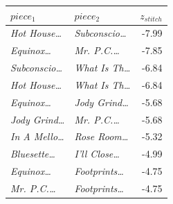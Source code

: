 \begin{tabular}{llr}
\toprule
$piece_1$ & $piece_2$ & $z_{stitch}$ \\
\midrule
\textit{Hot House\dots} & \textit{Subconscio\dots} & -7.99 \\
\textit{Equinox\dots} & \textit{Mr. P.C.\dots} & -7.85 \\
\textit{Subconscio\dots} & \textit{What Is Th\dots} & -6.84 \\
\textit{Hot House\dots} & \textit{What Is Th\dots} & -6.84 \\
\textit{Equinox\dots} & \textit{Jody Grind\dots} & -5.68 \\
\textit{Jody Grind\dots} & \textit{Mr. P.C.\dots} & -5.68 \\
\textit{In A Mello\dots} & \textit{Rose Room\dots} & -5.32 \\
\textit{Bluesette\dots} & \textit{I'll Close\dots} & -4.99 \\
\textit{Equinox\dots} & \textit{Footprints\dots} & -4.75 \\
\textit{Mr. P.C.\dots} & \textit{Footprints\dots} & -4.75 \\
\bottomrule
\end{tabular}
